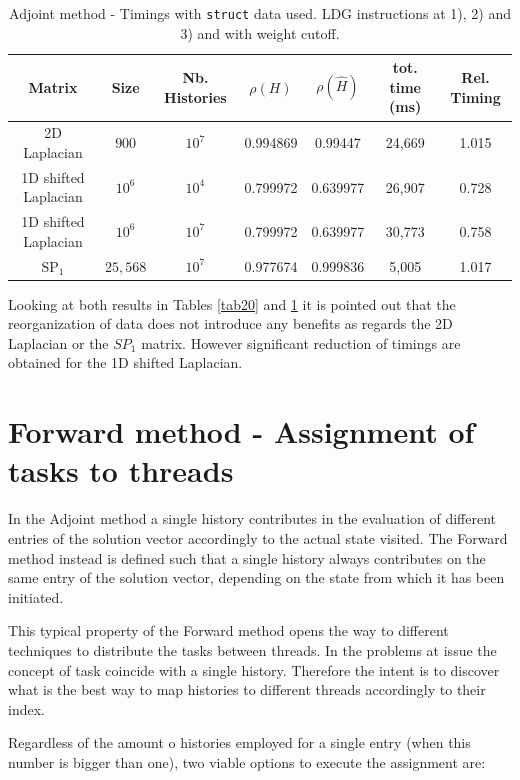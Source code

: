 \documentclass[a4paper,10pt]{article}
\begin{document}
\begin{table}[!h]
\hspace*{-1cm}
\begin{tabular}{|c|c|c|c|c|c|c|}
\hline
\textbf{Matrix} & \textbf{Size} &\textbf{Nb. Histories} & $\rho(H)$ 
& $\rho(\hat{H})$ & tot. time (ms) & Rel. Timing\\
\hline
2D Laplacian& $900$ & $10^7$ & 0.994869 & 0.99447 & 24,669 & 1.015\\
\hline 
1D shifted Laplacian& $10^6$ & $10^4$ & 0.799972 & 0.639977 & 26,907 & 0.728\\
\hline
1D shifted Laplacian& $10^6$ & $10^7$ & 0.799972 & 0.639977 & 30,773 & 0.758\\
\hline
$\text{SP}_1$ & $25,568$ & $10^7$ & 0.977674 & 0.999836 & 5,005 & 1.017\\
\hline
\end{tabular}
\caption{Adjoint method - Timings with \texttt{struct} data used. LDG 
instructions at 1), 2) and 
3) and with weight cutoff.}
\label{tab21}
\end{table}


Looking at both results in Tables \ref{tab20} and \ref{tab21} it is pointed out 
that the reorganization of data does not introduce any benefits as regards the 
2D Laplacian or the $SP_1$ matrix. However significant reduction of timings are 
obtained for the 1D shifted Laplacian. 


\section{Forward method - Assignment of tasks to threads}


In the Adjoint method a single history contributes in the 
evaluation of different entries of the solution vector accordingly to the 
actual state visited. The Forward method instead is defined such that a single 
history always contributes on the same entry of the solution 
vector, depending on the state from which it has been initiated.


This typical property of the Forward method opens the way to different 
techniques to distribute the tasks between threads. In the problems at issue 
the concept of task coincide with a single history. Therefore the intent is to 
discover what is the best way to map histories to different threads accordingly 
to their index. 


Regardless of the amount o histories employed for a single entry (when this 
number is bigger than one), two viable options to execute the assignment are:
\end{document}
